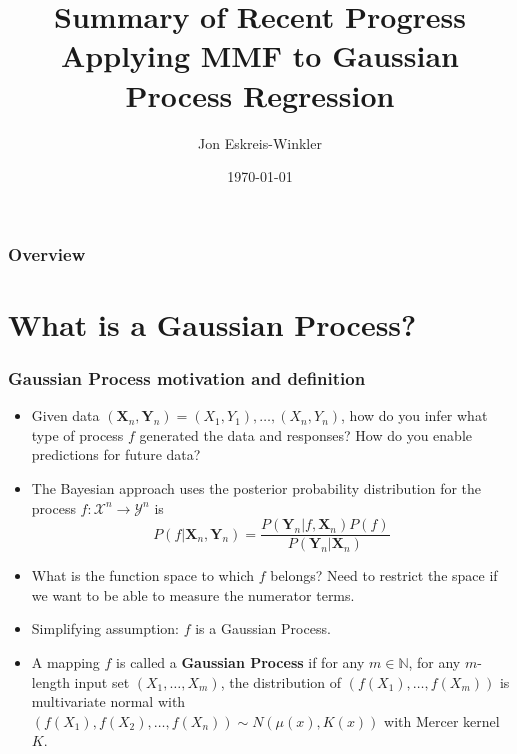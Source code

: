 \documentclass{beamer}
\title[GPR using MMF]{Summary of Recent Progress Applying MMF to Gaussian Process Regression} %
\author{Jon Eskreis-Winkler} %
\institute[UChicago] %
{
University of Chicago \\ %
\medskip
\textit{eskreiswinkler@uchicago.edu} %
}
\date{\today} %
\begin{document}
\begin{frame}
\titlepage %
\end{frame}

\begin{frame}
\frametitle{Overview} %
\tableofcontents %
\end{frame}

\section{What is a Gaussian Process?}%


\begin{frame}
\frametitle{Gaussian Process motivation and definition}

\begin{itemize}
\item Given data $(\textbf{X}_n, \textbf{Y}_n)=(X_1, Y_1), \dots, (X_n, Y_n)$, how do you infer what type of process $f$ generated the data and responses? How do you enable predictions for future data?
\item The Bayesian approach uses  the posterior probability distribution for the process $f: \mathcal{X}^n \rightarrow \mathcal{Y}^n$ is 
$$P(f|\textbf{X}_n, \textbf{Y}_n) = \frac{P(\textbf{Y}_n|f, \textbf{X}_n)P(f)}{P(\textbf{Y}_n|\textbf{X}_n)}$$
\item What is the function space to which $f$ belongs? Need to restrict the space if we want to be able to measure the numerator terms.
\item Simplifying assumption: $f$ is a Gaussian Process.
\item A mapping $f$ is called a \textbf{Gaussian Process} if for any $m\in\mathbb{N}$, for any $m$-length  input set $(X_1, \dots, X_m)$, the distribution of $(f(X_1), \dots, f(X_m))$ is multivariate normal with $(f(X_1), f(X_2), \dots , f(X_n)) \sim N(\mu(x), K(x))$ with Mercer kernel $K$.
\end{itemize}
\end{frame}
\end{document}
